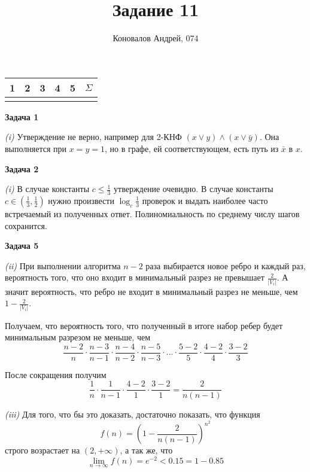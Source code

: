 \documentclass[10pt]{article}
\title{Задание 11}
\author{Коновалов Андрей, 074}
\date{}
\begin{document}
\maketitle

\noindent
\begin{tabularx}{\textwidth}{|C|C|C|C|C|C|}
   & 2 & 3 & 4 & 5 & $\Sigma$ \\
  \hline
  &&&&& \\
  \hline
\end{tabularx}

\bigskip

{\bf Задача 1}

{\it (i)}
Утверждение не верно, например для 2-КНФ $(x \vee y) \wedge (x \vee \bar{y})$.
Она выполняется при $x = y = 1$, но в графе, ей соответствующем, есть путь из $\bar{x}$ в $x$.

\medskip

{\bf Задача 2}

{\it (i)}
В случае константы $c \leq \frac{1}{3}$ утверждение очевидно.
В случае константы $c \in (\frac{1}{3}, \frac{1}{2})$ нужно произвести $\log_c{\frac{1}{3}}$ проверок и выдать наиболее часто встречаемый из полученных ответ.
Полиномиальность по среднему числу шагов сохранится.

\medskip

{\bf Задача 5}

{\it (ii)}
При выполнении алгоритма $n - 2$ раза выбирается новое ребро и каждый раз, вероятность того, что оно входит в минимальный разрез не превышает $\frac{2}{|V_i|}$.
А значит вероятность, что ребро не входит в минимальный разрез не меньше, чем $1 - \frac{2}{|V_i|}$.

Получаем, что вероятность того, что полученный в итоге набор ребер будет минимальным разрезом не меньше, чем
$$
\frac{n - 2}{n} \cdot \frac{n - 3}{n - 1} \cdot \frac{n - 4}{n - 2} \cdot \frac{n - 5}{n - 3} \cdot ... \cdot \frac{5 - 2}{5} \cdot \frac{4 - 2}{4} \cdot \frac{3 - 2}{3}
$$

После сокращения получим
$$
\frac{1}{n} \cdot \frac{1}{n - 1} \cdot \frac{4 - 2}{1} \cdot \frac{3 - 2}{1} = \frac{2}{n (n - 1)}
$$

\smallskip

{\it (iii)}
Для того, что бы это доказать, достаточно показать, что функция
$$
  f(n) = \left( 1 - \frac{2}{n (n - 1)} \right)^{n^2}
$$
строго возрастает на $(2, + \infty)$, а так же, что
$$
  \lim_{n \to \infty} f(n) = e^{-2} < 0.15 = 1 - 0.85
$$
\end{document}
